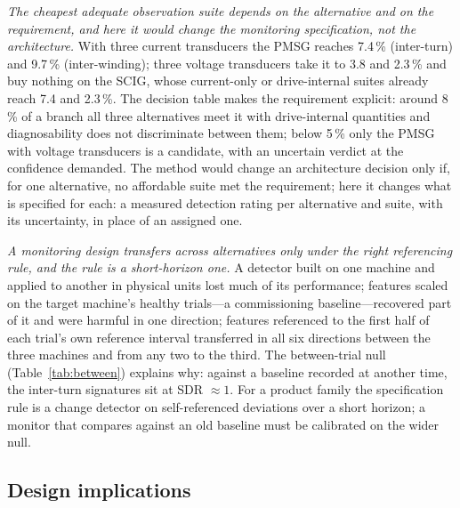 \emph{The cheapest adequate observation suite depends on the alternative and on the requirement, and here it would change the monitoring specification, not the architecture.} With three current transducers the PMSG reaches 7.4\,\% (inter-turn) and 9.7\,\% (inter-winding); three voltage transducers take it to 3.8 and 2.3\,\% and buy nothing on the SCIG, whose current-only or drive-internal suites already reach 7.4 and 2.3\,\%. The decision table makes the requirement explicit: around 8\,\% of a branch all three alternatives meet it with drive-internal quantities and diagnosability does not discriminate between them; below 5\,\% only the PMSG with voltage transducers is a candidate, with an uncertain verdict at the confidence demanded. The method would change an architecture decision only if, for one alternative, no affordable suite met the requirement; here it changes what is specified for each: a measured detection rating per alternative and suite, with its uncertainty, in place of an assigned one.

\emph{A monitoring design transfers across alternatives only under the right referencing rule, and the rule is a short-horizon one.} A detector built on one machine and applied to another in physical units lost much of its performance; features scaled on the target machine's healthy trials---a commissioning baseline---recovered part of it and were harmful in one direction; features referenced to the first half of each trial's own reference interval transferred in all six directions between the three machines and from any two to the third. The between-trial null (Table~\ref{tab:between}) explains why: against a baseline recorded at another time, the inter-turn signatures sit at SDR $\approx1$. For a product family the specification rule is a change detector on self-referenced deviations over a short horizon; a monitor that compares against an old baseline must be calibrated on the wider null.

\subsection{Design implications}

